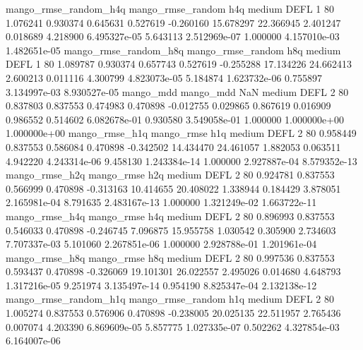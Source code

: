 mango_rmse_random_h4q mango_rmse_random                  h4q     medium     DEFL                 1 80  1.076241       0.930374 0.645631       0.527619   -0.260160     15.678297     22.366945     2.401247       0.018689  4.218900 6.495327e-05     5.643113   2.512969e-07            1.000000    4.157010e-03        1.482651e-05
mango_rmse_random_h8q mango_rmse_random                  h8q     medium     DEFL                 1 80  1.089787       0.930374 0.657743       0.527619   -0.255288     17.134226     24.662413     2.600213       0.011116  4.300799 4.823073e-05     5.184874   1.623732e-06            0.755897    3.134997e-03        8.930527e-05
            mango_mdd         mango_mdd                  NaN     medium     DEFL                 2 80  0.837803       0.837553 0.474983       0.470898   -0.012755      0.029865      0.867619     0.016909       0.986552  0.514602 6.082678e-01     0.930580   3.549058e-01            1.000000    1.000000e+00        1.000000e+00
       mango_rmse_h1q        mango_rmse                  h1q     medium     DEFL                 2 80  0.958449       0.837553 0.586084       0.470898   -0.342502     14.434470     24.461057     1.882053       0.063511  4.942220 4.243314e-06     9.458130   1.243384e-14            1.000000    2.927887e-04        8.579352e-13
       mango_rmse_h2q        mango_rmse                  h2q     medium     DEFL                 2 80  0.924781       0.837553 0.566999       0.470898   -0.313163     10.414655     20.408022     1.338944       0.184429  3.878051 2.165981e-04     8.791635   2.483167e-13            1.000000    1.321249e-02        1.663722e-11
       mango_rmse_h4q        mango_rmse                  h4q     medium     DEFL                 2 80  0.896993       0.837553 0.546033       0.470898   -0.246745      7.096875     15.955758     1.030542       0.305900  2.734603 7.707337e-03     5.101060   2.267851e-06            1.000000    2.928788e-01        1.201961e-04
       mango_rmse_h8q        mango_rmse                  h8q     medium     DEFL                 2 80  0.997536       0.837553 0.593437       0.470898   -0.326069     19.101301     26.022557     2.495026       0.014680  4.648793 1.317216e-05     9.251974   3.135497e-14            0.954190    8.825347e-04        2.132138e-12
mango_rmse_random_h1q mango_rmse_random                  h1q     medium     DEFL                 2 80  1.005274       0.837553 0.576906       0.470898   -0.238005     20.025135     22.511957     2.765436       0.007074  4.203390 6.869609e-05     5.857775   1.027335e-07            0.502262    4.327854e-03        6.164007e-06
